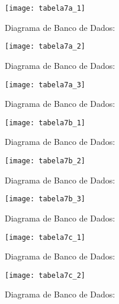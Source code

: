 \begin{figure}[!h]
    \centering
    \caption{Diagrama de Banco de Dados:}%
    \label{fig:tabela7a_1}
    \texttt{[image: tabela7a\_1]}
    \end{figure}

    \begin{figure}[!h]
        \centering
        \caption{Diagrama de Banco de Dados:}%
        \label{fig:tabela7a_2}
        \texttt{[image: tabela7a\_2]}
        \end{figure}

        \begin{figure}[!h]
            \centering
            \caption{Diagrama de Banco de Dados:}%
            \label{fig:tabela7a_3}
            \texttt{[image: tabela7a\_3]}
            \end{figure}

\begin{figure}[!h]
    \centering
    \caption{Diagrama de Banco de Dados:}%
    \label{fig:tabela7b_1}
    \texttt{[image: tabela7b\_1]}
    \end{figure}

    \begin{figure}[!h]
        \centering
        \caption{Diagrama de Banco de Dados:}%
        \label{fig:tabela7b_2}
        \texttt{[image: tabela7b\_2]}
        \end{figure}

        \begin{figure}[!h]
            \centering
            \caption{Diagrama de Banco de Dados:}%
            \label{fig:tabela7b_3}
            \texttt{[image: tabela7b\_3]}
            \end{figure}

    \begin{figure}[!h]
        \centering
        \caption{Diagrama de Banco de Dados:}%
        \label{fig:tabela7c_1}
        \texttt{[image: tabela7c\_1]}
        \end{figure}

        
    \begin{figure}[!h]
        \centering
        \caption{Diagrama de Banco de Dados:}%
        \label{fig:tabela7c_2}
        \texttt{[image: tabela7c\_2]}
        \end{figure}

